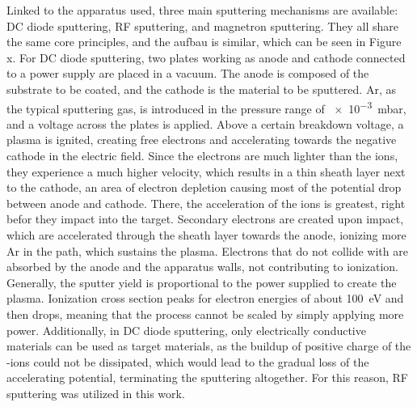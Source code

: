 Linked to the apparatus used, three main sputtering mechanisms are available: \ac{DC} diode sputtering, \ac{RF} sputtering, and magnetron sputtering.
They all share the same core principles, and the aufbau is similar, which can be seen in Figure x. 
For \ac{DC} diode sputtering, two plates working as anode and cathode connected to a power supply are placed in a vacuum.
The anode is composed of the substrate to be coated, and the cathode is the material to be sputtered\cite{Frey2015}.
\ac{Ar}, as the typical sputtering gas, is introduced in the pressure range of \SI{e-3}{mbar}, and a voltage across the plates is applied\cite{Seshan2012}.  
Above a certain breakdown voltage, a plasma is ignited, creating free electrons and accelerating  towards the negative cathode in the electric field.
Since the electrons are much lighter than the ions, they experience a much higher velocity, which results in a thin sheath layer next to the cathode, an area of electron depletion causing most of the potential drop between anode and cathode\cite{Seshan2012}. 
There, the acceleration of the ions is greatest, right befor they impact into the target\cite{Paetzold2004}. 
Secondary electrons are created upon impact, which are accelerated through the sheath layer towards the anode, ionizing more \ac{Ar} in the path, which sustains the plasma.   
Electrons that do not collide with  are absorbed by the anode and the apparatus walls, not contributing to ionization\cite{Seshan2012}.
Generally, the sputter yield is proportional to the power supplied to create the plasma.
Ionization cross section peaks for electron energies of about \SI{100}{eV} and then drops, meaning that the process cannot be scaled by simply applying more power\cite{Seshan2012}. 
Additionally, in \ac{DC} diode sputtering, only electrically conductive materials can be used as target materials, as the buildup of positive charge of the -ions could not be dissipated, which would lead to the gradual loss of the accelerating potential, terminating the sputtering altogether\cite{Paetzold2004}. 
For this reason, \ac{RF} sputtering was utilized in this work.

